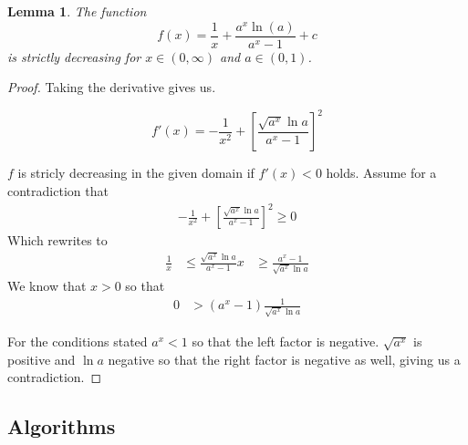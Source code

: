 \documentclass[10pt]{article}
\newtheorem{lma}{Lemma}
\begin{document}
\begin{lma}
\label{monotonicity}
The function
\[
f(x) = \frac{1}{x} + \frac{a^x \ln(a)}{a^x - 1} + c
\]
is strictly decreasing for $ x \in (0, \infty)$ and $ a \in (0, 1)$.
\end{lma}
\begin{proof}
Taking the derivative gives us. 

\[
f'(x) = -\frac{1}{x^2} + \left [ \frac{\sqrt{a^x}\ln a}{a^x - 1} \right ]^2
\]

$f$ is stricly decreasing in the given domain if $f'(x) < 0$ holds. Assume for a contradiction that
\begin{align*}
-\frac{1}{x^2} + \left [ \frac{\sqrt{a^x}\ln a}{a^x - 1} \right ]^2 \geq 0
\end{align*}
Which rewrites to 
\begin{align*}
\frac{1}{x}  &\leq \frac{\sqrt{a^x}\ln a}{a^x - 1}
x  &\geq \frac{a^x - 1}{\sqrt{a^x}\ln a}
\end{align*}
We know that $x > 0$ so that 
\begin{align*}
0  &> (a^x - 1)\frac{1}{\sqrt{a^x}\ln a}
\end{align*}

For the conditions stated $a^x < 1$ so that the left factor is negative. $\sqrt{a^x}$ is positive and $\ln a$ negative so that the right factor is negative as well, giving us a contradiction.
\end{proof}


\subsection{Algorithms}



\end{document}
